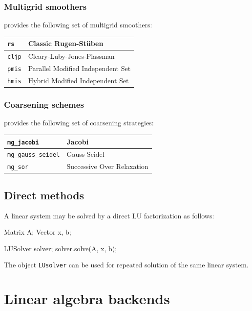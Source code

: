 \subsubsection{Multigrid smoothers}
\dolfin{} provides the following set of multigrid smoothers:
\begin{center}
\begin{tabular}{|l|l|}
\hline
\texttt{rs}        & Classic Rugen-St\"{u}ben \\
\hline
\texttt{cljp}      &  Cleary-Luby-Jones-Plassman \\
\hline
\texttt{pmis}       & Parallel Modified Independent Set\\
\hline
\texttt{hmis}       &Hybrid Modified Independent Set\\
\hline
\end{tabular}
\end{center}
\subsubsection{Coarsening schemes}
\dolfin{} provides the following set of coarsening strategies:
\begin{center}
\begin{tabular}{|l|l|}
\hline
\texttt{mg\_jacobi}        & Jacobi \\
\hline
\texttt{mg\_gauss\_seidel}      & Gauss-Seidel\\
\hline
\texttt{mg\_sor}       & Successive Over Relaxation\\
\hline
\end{tabular}
\end{center}
\subsection{Direct methods}

A linear system may be solved by a direct LU factorization as follows:
\begin{code}
Matrix A;
Vector x, b;

LUSolver solver;
solver.solve(A, x, b);
\end{code}
The object \texttt{LUsolver} can be used for repeated solution of the same linear system.

\section{Linear algebra backends}


